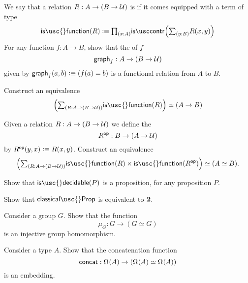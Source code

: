 \begin{exercises}
\begin{subexenum}
\begin{equation*}
\end{equation*}
\item We say that a relation $R:A\to (B\to\mathcal{U})$ is  if it comes equipped with a term of type
\begin{equation*}
\mathsf{is\usc{}function}(R) \defeq \prd{x:A}\iscontr\Big(\sm{y:B}R(x,y)\Big)
\end{equation*}
For any function $f:A\to B$, show that the  of $f$ 
\begin{equation*}
\mathsf{graph}_f:A\to (B\to \mathcal{U})
\end{equation*}
given by $\mathsf{graph}_f(a,b)\vcentcolon\equiv (f(a)=b)$ is a functional relation from $A$ to $B$.
\item Construct an equivalence
\begin{equation*}
\eqv{\Big(\sm{R:A\to (B\to\UU)}\mathsf{is\usc{}function}(R)\Big)}{(A\to B)}
\end{equation*}
\item Given a relation $R:A\to (B\to \mathcal{U})$ we define the 
\begin{equation*}
R^{\mathsf{op}} : B\to (A\to\mathcal{U})
\end{equation*}
by $R^{\mathsf{op}}(y,x)\vcentcolon\equiv R(x,y)$. Construct an equivalence
\begin{equation*}
\eqv{\Big(\sm{R:A\to (B\to \UU)}\mathsf{is\usc{}function}(R)\times\mathsf{is\usc{}function}(R^{\mathsf{op}})\Big)}{(\eqv{A}{B})}.
\end{equation*}
\end{subexenum}
\item
  \begin{subexenum}
  \item Show that $\mathsf{is\usc{}decidable}(P)$ is a proposition, for any proposition $P$.
  \item Show that $\mathsf{classical\usc{}Prop}$ is equivalent to $\mathbf{2}$.
  \end{subexenum}
\item
  \begin{subexenum}
  \item Consider a group $G$. Show that the function
    \begin{equation*}
      \mu_G:G\to (G\simeq G)
    \end{equation*}
    is an injective group homomorphism.
  \item Consider a type $A$. Show that the concatenation function
    \begin{equation*}
      \mathsf{concat}:\Omega^{}(A)\to (\Omega^{}(A)\simeq\Omega^{}(A))
    \end{equation*}
    is an embedding.
  \end{subexenum}
\end{exercises}
